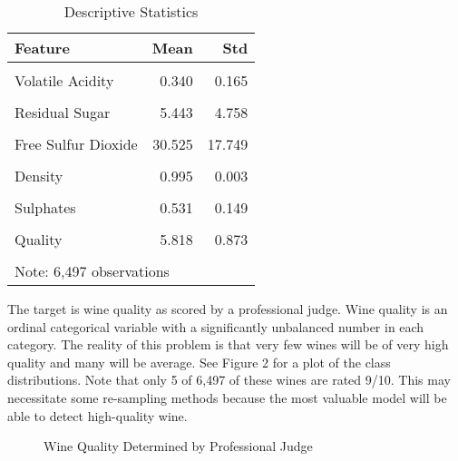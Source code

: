 \documentclass[16pt,twocolumn,letterpaper,titlepage]{article}
\begin{document}
\begin{table}[!h]

\caption{Descriptive Statistics}
\centering
\begin{tabular}[t]{lrr}
\toprule
Feature & Mean & Std\\
\midrule
\cellcolor{gray!6}{Fixed Acidity} & \cellcolor{gray!6}{7.215} & \cellcolor{gray!6}{1.296}\\
Volatile Acidity & 0.340 & 0.165\\
\cellcolor{gray!6}{Citric Acid} & \cellcolor{gray!6}{0.319} & \cellcolor{gray!6}{0.145}\\
Residual Sugar & 5.443 & 4.758\\
\cellcolor{gray!6}{Chlorides} & \cellcolor{gray!6}{0.056} & \cellcolor{gray!6}{0.035}\\
\addlinespace
Free Sulfur Dioxide & 30.525 & 17.749\\
\cellcolor{gray!6}{Total Sulfur Dioxide} & \cellcolor{gray!6}{115.745} & \cellcolor{gray!6}{56.522}\\
Density & 0.995 & 0.003\\
\cellcolor{gray!6}{Ph} & \cellcolor{gray!6}{3.219} & \cellcolor{gray!6}{0.161}\\
Sulphates & 0.531 & 0.149\\
\addlinespace
\cellcolor{gray!6}{Alcohol} & \cellcolor{gray!6}{10.492} & \cellcolor{gray!6}{1.193}\\
Quality & 5.818 & 0.873\\
\cellcolor{gray!6}{Is Red} & \cellcolor{gray!6}{0.246} & \cellcolor{gray!6}{0.431}\\
\bottomrule
\multicolumn{3}{l}{Note: 6,497 observations}\\
\end{tabular}
\end{table}

The target is wine quality as scored by a professional judge. Wine quality is an ordinal categorical variable with a significantly unbalanced number in each category. The reality of this problem is that very few wines will be of very high quality and many will be average. See Figure 2 for a plot of the class distributions. Note that only 5 of 6,497 of these wines are rated 9/10. This may necessitate some re-sampling methods because the most valuable model will be able to detect high-quality wine. 

\begin{figure}[!htb]
	\caption{\label{fig:my-label} Wine Quality Determined by Professional Judge}
\end{figure}
\end{document}
